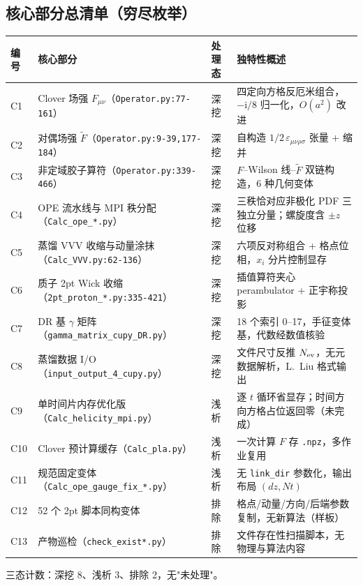 \documentclass[UTF8]{ctexart}
\begin{document}
\subsection{核心部分总清单（穷尽枚举）}
\begin{xltabular}{\textwidth}{lllX}
\toprule
\textcolor{algo}{编号} & 核心部分 & 处理态 & 独特性概述 \\
\midrule
\endhead
C1 & Clover 场强 $F_{\mu\nu}$（\texttt{Operator.py:77-161}） & 深挖 & 四定向方格反厄米组合，$-\mathrm i/8$ 归一化，$O(a^2)$ 改进 \\
C2 & 对偶场强 $\widetilde F$（\texttt{Operator.py:9-39,177-184}） & 深挖 & 自构造 $1/2\,\varepsilon_{\mu\nu\rho\sigma}$ 张量 + 缩并 \\
C3 & 非定域胶子算符（\texttt{Operator.py:339-466}） & 深挖 & $F$--Wilson 线--$\widetilde F$ 双链构造，6 种几何变体 \\
C4 & OPE 流水线与 MPI 秩分配（\texttt{Calc\_ope\_*.py}） & 深挖 & 三秩恰对应非极化 PDF 三独立分量；螺旋度含 $\pm z$ 位移 \\
C5 & 蒸馏 VVV 收缩与动量涂抹（\texttt{Calc\_VVV.py:62-136}） & 深挖 & 六项反对称组合 + 格点位相，$x_i$ 分片控制显存 \\
C6 & 质子 2pt Wick 收缩（\texttt{2pt\_proton\_*.py:335-421}） & 深挖 & 插值算符夹心 perambulator + 正宇称投影 \\
C7 & DR 基 $\gamma$ 矩阵（\texttt{gamma\_matrix\_cupy\_DR.py}） & 深挖 & 18 个索引 0--17，手征变体基，代数经数值核验 \\
C8 & 蒸馏数据 I/O（\texttt{input\_output\_4\_cupy.py}） & 深挖 & 文件尺寸反推 $N_{\rm ev}$，无元数据解析，L.~Liu 格式输出 \\
C9 & 单时间片内存优化版（\texttt{Calc\_helicity\_mpi.py}） & 浅析 & 逐 $t$ 循环省显存；时间方向方格占位返回零（未完成） \\
C10 & Clover 预计算缓存（\texttt{Calc\_pla.py}） & 浅析 & 一次计算 $F$ 存 \texttt{.npz}，多作业复用 \\
C11 & 规范固定变体（\texttt{Calc\_ope\_gauge\_fix\_*.py}） & 浅析 & 无 \texttt{link\_dir} 参数化，输出布局 $(dz,Nt)$ \\
C12 & 52 个 2pt 脚本同构变体 & 排除 & 格点/动量/方向/后端参数复制，无新算法（样板） \\
C13 & 产物巡检（\texttt{check\_exist*.py}） & 排除 & 文件存在性扫描脚本，无物理与算法内容 \\
\bottomrule
\end{xltabular}

三态计数：深挖 8、浅析 3、排除 2，无"未处理"。
\end{document}
